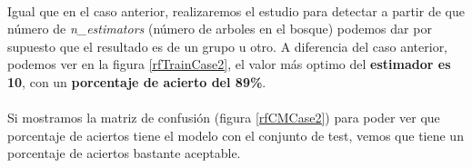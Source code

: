 \paragraph{}
Igual que en el caso anterior, realizaremos el estudio para detectar a partir de que número de \textit{n\_estimators}\cite{ref:rf_random_forest_classifier} (número de arboles en el bosque) podemos dar por supuesto que el resultado es de un grupo u otro. A diferencia del caso anterior, podemos ver en la figura \ref{rfTrainCase2}, el valor más optimo del \textbf{estimador es 10}, con un \textbf{porcentaje de acierto del 89\%}.

\paragraph{}
Si mostramos la matriz de confusión\cite{ref:confusion_matrix} (figura \ref{rfCMCase2}) para poder ver que porcentaje de aciertos tiene el modelo con el conjunto de test, vemos que tiene un porcentaje de aciertos bastante aceptable.

